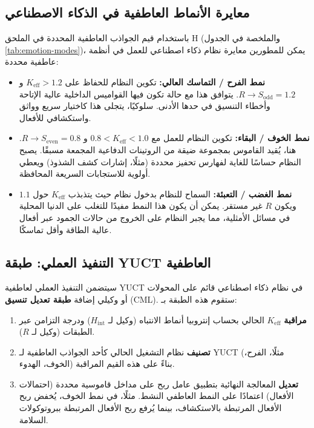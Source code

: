 \documentclass[12pt,a4paper]{article}
\begin{document}
	\subsection{معايرة الأنماط العاطفية في الذكاء الاصطناعي}
	
	باستخدام قيم الجواذب العاطفية المحددة في الملحق H (والملخصة في الجدول \ref{tab:emotion-modes})، يمكن للمطورين معايرة نظام ذكاء اصطناعي للعمل في أنظمة عاطفية محددة:
	
	\begin{itemize}
		\item \textbf{نمط الفرح / التماسك العالي:} تكوين النظام للحفاظ على \(K_{\mathrm{eff}} > 1.2\) و \(R \to S_{\mathrm{odd}} = 1.2\). يتوافق هذا مع حالة تكون فيها القواميس الداخلية عالية الإتاحة وأخطاء التنسيق في حدها الأدنى. سلوكيًا، يتجلى هذا كاختيار سريع وواثق واستكشافي للأفعال.
		\item \textbf{نمط الخوف / البقاء:} تكوين النظام للعمل مع \(0.8 < K_{\mathrm{eff}} < 1.0\) و \(R \to S_{\mathrm{even}} = 0.8\). هنا، يُقيد القاموس بمجموعة ضيقة من الروتينات الدفاعية المجمعة مسبقًا. يصبح النظام حساسًا للغاية لفهارس تحفيز محددة (مثلًا، إشارات كشف الشذوذ) ويعطي أولوية للاستجابات السريعة المحافظة.
		\item \textbf{نمط الغضب / التعبئة:} السماح للنظام بدخول نظام حيث يتذبذب \(K_{\mathrm{eff}}\) حول \(1.1\) ويكون \(R\) غير مستقر. يمكن أن يكون هذا النمط مفيدًا للتغلب على الدنيا المحلية في مسائل الأمثلية، مما يجبر النظام على الخروج من حالات الجمود عبر أفعال عالية الطاقة وأقل تماسكًا.
	\end{itemize}
	
	\subsection{التنفيذ العملي: طبقة YUCT العاطفية}
	
	سيتضمن التنفيذ العملي لعاطفية YUCT في نظام ذكاء اصطناعي قائم على المحولات أو وكيلي إضافة \textbf{طبقة تعديل تنسيق} (CML). ستقوم هذه الطبقة بـ:
	
	\begin{enumerate}
		\item \textbf{مراقبة} \(K_{\mathrm{eff}}\) الحالي بحساب إنتروبيا أنماط الانتباه (وكيل لـ \(H_{\mathrm{int}}\)) ودرجة التزامن عبر الطبقات (وكيل لـ \(R\)).
		\item \textbf{تصنيف} نظام التشغيل الحالي كأحد الجواذب العاطفية لـ YUCT (مثلًا، الفرح، الخوف، الهدوء) بناءً على هذه القيم المراقبة.
		\item \textbf{تعديل} المعالجة النهائية بتطبيق عامل ربح على مداخل قاموسية محددة (احتمالات الأفعال) اعتمادًا على النمط العاطفي النشط. مثلًا، في نمط الخوف، يُخفض ربح الأفعال المرتبطة بالاستكشاف، بينما يُرفع ربح الأفعال المرتبطة ببروتوكولات السلامة.
	\end{enumerate}
	
\end{document}
